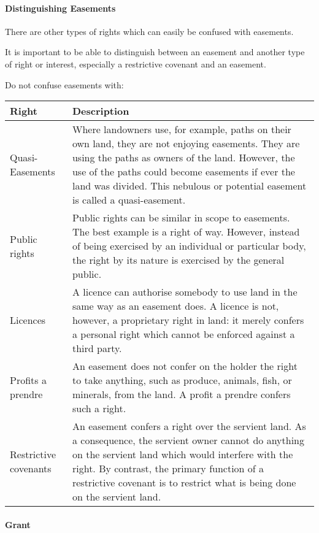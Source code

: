 \documentclass[
]{article}
\begin{document}
\hypertarget{distinguishing-easements}{%
\paragraph{Distinguishing Easements}\label{distinguishing-easements}}

There are other types of rights which can easily be confused with
easements.

It is important to be able to distinguish between an easement and
another type of right or interest, especially a restrictive covenant and
an easement.

Do not confuse easements with:

\begin{longtable}[]{@{}ll@{}}
\toprule()
Right & Description \\
\midrule()
\endhead
Quasi-Easements & Where landowners use, for example, paths on their own
land, they are not enjoying easements. They are using the paths as
owners of the land. However, the use of the paths could become easements
if ever the land was divided. This nebulous or potential easement is
called a quasi-easement. \\
Public rights & Public rights can be similar in scope to easements. The
best example is a right of way. However, instead of being exercised by
an individual or particular body, the right by its nature is exercised
by the general public. \\
Licences & A licence can authorise somebody to use land in the same way
as an easement does. A licence is not, however, a proprietary right in
land: it merely confers a personal right which cannot be enforced
against a third party. \\
Profits a prendre & An easement does not confer on the holder the right
to take anything, such as produce, animals, fish, or minerals, from the
land. A profit a prendre confers such a right. \\
Restrictive covenants & An easement confers a right over the servient
land. As a consequence, the servient owner cannot do anything on the
servient land which would interfere with the right. By contrast, the
primary function of a restrictive covenant is to restrict what is being
done on the servient land. \\
\bottomrule()
\end{longtable}

\hypertarget{grant}{%
\paragraph{Grant}\label{grant}}
\end{document}
